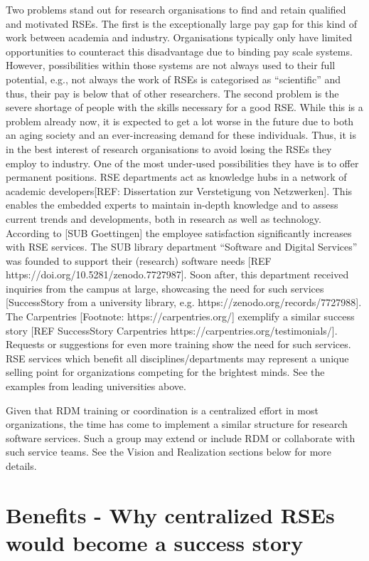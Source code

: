 \documentclass{article}
\begin{document}
Two problems stand out for research organisations to find and retain qualified and motivated RSEs.
The first is the exceptionally large pay gap for this kind of work between academia and industry.
Organisations typically only have limited opportunities to counteract this disadvantage due to binding pay scale systems.
However, possibilities within those systems are not always used to their full potential, e.g., not always the work of RSEs is categorised as “scientific” and thus, their pay is below that of other researchers.
The second problem is the severe shortage of people with the skills necessary for a good RSE.
While this is a problem already now, it is expected to get a lot worse in the future due to both an aging society and an ever-increasing demand for these individuals.
Thus, it is in the best interest of research organisations to avoid losing the RSEs they employ to industry.
One of the most under-used possibilities they have is to offer permanent positions. 
RSE departments act as knowledge hubs in a network of academic developers[REF: Dissertation zur Verstetigung von Netzwerken].
This enables the embedded experts to maintain in-depth knowledge and to assess current trends and developments, both in research as well as technology.
According to [SUB Goettingen] the employee satisfaction significantly increases with RSE services.
The SUB library department “Software and Digital Services” was founded to support their (research) software needs [REF https://doi.org/10.5281/zenodo.7727987].
Soon after, this department received inquiries from the campus at large, showcasing the need for such services [SuccessStory from a university library, e.g. https://zenodo.org/records/7727988]. The Carpentries [Footnote: https://carpentries.org/] exemplify a similar success story [REF SuccessStory Carpentries https://carpentries.org/testimonials/]. Requests or suggestions for even more training show the need for such services.
RSE services which benefit all disciplines/departments may represent a unique selling point for organizations competing for the brightest minds.
See the examples from leading universities above.

Given that RDM training or coordination is a centralized effort in most organizations, the time has come to implement a similar structure for research software services.
Such a group may extend or include RDM or collaborate with such service teams.
See the Vision and Realization sections below for more details.

\section{Benefits - Why centralized RSEs would become a success story}
\end{document}

